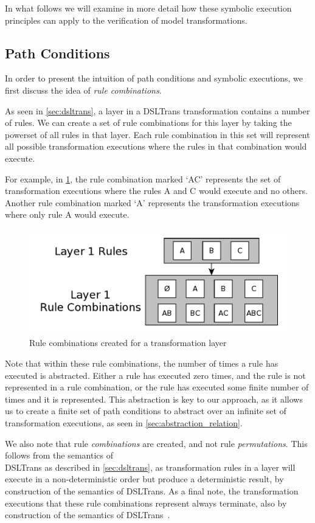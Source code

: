 In what follows we will examine in more detail how these symbolic execution
principles can apply to the verification of model transformations.


\subsection{Path Conditions}
\label{sec:gen_path_conds}

In order to present the intuition of path conditions and symbolic executions, we
first discuss the idea of \textit{rule combinations}.

As seen in \cref{sec:dsltrans}, a layer in a DSLTrans transformation contains a
number of rules.  We can create a set of rule combinations for this layer by
taking the powerset of all rules in that layer. Each rule combination in this
set will represent all possible transformation executions where the rules in
that combination would execute.

For example, in \cref{fig:rule_combos2}, the rule combination marked `AC'
represents the set of transformation executions where the rules A and C would
execute and no others. Another rule combination marked `A' represents the
transformation executions where only rule A would execute.

\begin{figure}[h!] \centering \includegraphics[width=.40\textwidth]{./figures/overview/rule_combos.pdf}
	\caption{Rule combinations created for a transformation layer}
	\label{fig:rule_combos2}
\end{figure}

Note that within these rule combinations, the number of times a rule has
executed is abstracted. Either a rule has executed zero times, and the rule is
not represented in a rule combination, or the rule has executed some finite
number of times and it is represented. This abstraction is key to our approach,
as it allows us to create a finite set of path conditions to abstract over an
infinite set of transformation executions, as seen in
\cref{sec:abstraction_relation}.

We also note that rule \textit{combinations} are created, and not rule
\textit{permutations}. This follows from the semantics of \\DSLTrans as described
in \cref{sec:dsltrans}, as transformation rules in a layer will execute in a
non-deterministic order but produce a deterministic result, by construction of the semantics of DSLTrans. As a final
note, the transformation executions that these rule combinations represent always terminate, also by construction of the semantics of DSLTrans~\cite{DBLP:conf/sle/BarrocaLAFS10}.


